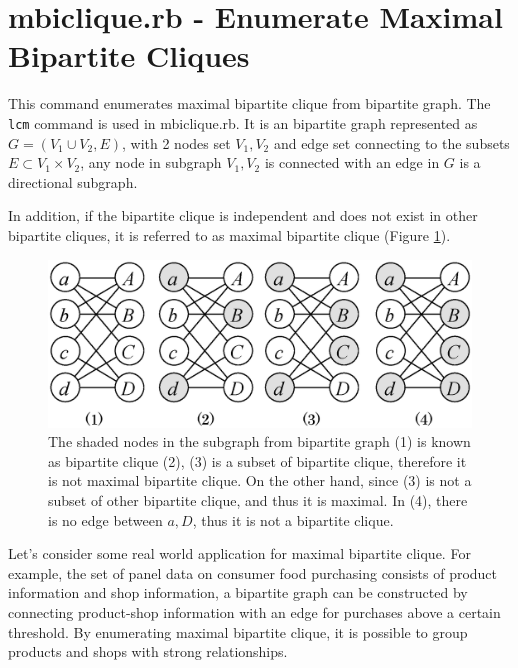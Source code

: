 
\section{mbiclique.rb - Enumerate Maximal Bipartite Cliques\label{sect:mbiclique}}

This command enumerates maximal bipartite clique from bipartite graph. The \verb|lcm| command \cite{UnoWeb} is used in mbiclique.rb. 
It is an bipartite graph represented as $G=(V_1 \cup V_2,E)$, with 2 nodes set  $V_1,V_2$ and edge set connecting to the subsets $E\subset V_1\times V_2$, any node in subgraph $V_1,V_2$  is connected with an edge in $G$ is a directional subgraph.

In addition, if the bipartite clique is independent and does not exist in other bipartite cliques, it is referred to as maximal bipartite clique (Figure \ref{fig:biclique}).

\begin{figure}[htbp]
\begin{center}
\includegraphics[scale=0.5]{./biclique.eps}
\caption{The shaded nodes in the subgraph from bipartite graph (1) is known as bipartite clique (2),  (3) is a subset of bipartite clique, therefore it is not maximal bipartite clique.  On the other hand, since (3) is not a subset of other bipartite clique, and thus it is maximal. In (4), there is no edge between $a,D$, thus it is not a bipartite clique.    \label{fig:biclique}}
\end{center}
\end{figure} 

Let's consider some real world application for maximal bipartite clique. 
For example, the set of panel data on consumer food purchasing consists of product information and shop information, a bipartite graph can be constructed by connecting product-shop information with an edge for purchases above a certain threshold. 
By enumerating maximal bipartite clique, it is possible to group products and shops with strong relationships. 

